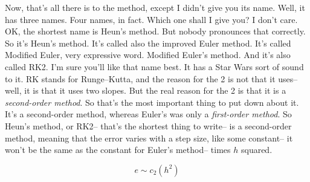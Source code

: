 Now, that's all there is to the method,
except I didn't give you its name.
Well, it has three names.
Four names, in fact.
Which one shall I give you?
I don't care.
OK, the shortest name is Heun's method.
But nobody pronounces that correctly.
So it's Heun's method.
It's called also the improved Euler method.
It's called Modified Euler, very expressive word.
Modified Euler's method.
And it's also called RK2.
I'm sure you'll like that name best.
It has a Star Wars sort of sound to it.
RK stands for Runge--Kutta, and the reason for the 2 is not
that it uses--
well, it is that it uses two slopes.
But the real reason for the 2 is that it is a \emph{second-order method}.
So that's the most important thing to put down about it.
It's a second-order method, whereas Euler's was only a \emph{first-order method}.
So Heun's method, or RK2-- that's the shortest thing to write--
is a second-order method, meaning that the error varies
with a step size, like some constant--
it won't be the same as the constant for Euler's method--
times $h$ squared.

\begin{equation*}
  e \sim c_2 (h^2)
\end{equation*}

